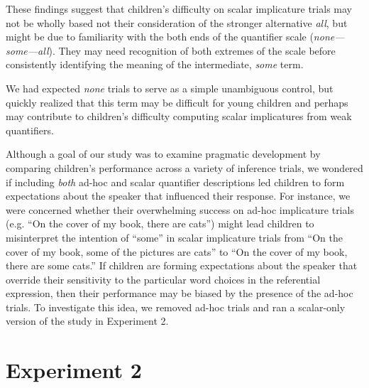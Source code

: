\documentclass[10pt,letterpaper]{article}
\begin{document}
These findings suggest that children's difficulty on scalar implicature trials may not be wholly based not their consideration of the stronger alternative \emph{all}, but might be due to familiarity with the both ends of the quantifier scale (\emph{none---some---all}). They may need recognition of both extremes of the scale before consistently identifying the meaning of the intermediate, \emph{some} term. 

We had expected \emph{none} trials to serve as a simple unambiguous control, but quickly realized that this term may be difficult for young children and perhaps may contribute to children's difficulty computing scalar implicatures from weak quantifiers. 

Although a goal of our study was to examine pragmatic development by comparing children's performance across a variety of inference trials, we wondered if including \emph{both} ad-hoc and scalar quantifier descriptions led children to form expectations about the speaker that influenced their response. For instance, we were concerned whether their overwhelming success on ad-hoc implicature trials (e.g. ``On the cover of my book, there are cats'') might lead children to misinterpret the intention of ``some'' in scalar implicature trials from ``On the cover of my book, some of the pictures are cats'' to ``On the cover of my book, there are some cats.'' If children are forming expectations about the speaker that override their sensitivity to the particular word choices in the referential expression, then their performance may be biased by the presence of the ad-hoc trials.  To investigate this idea, we removed ad-hoc trials and ran a scalar-only version of the study in Experiment 2. 



	


\section{Experiment 2} 

\end{document}

